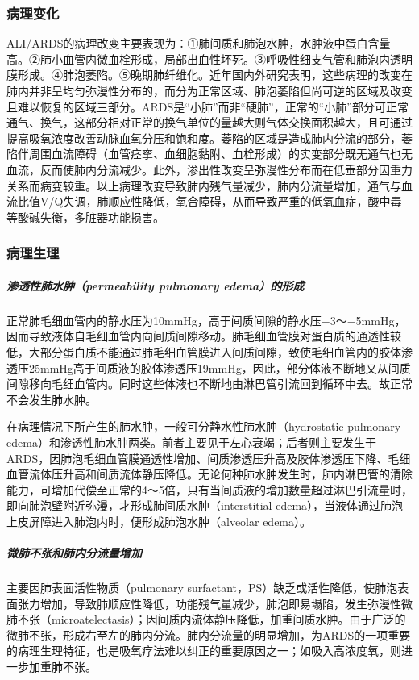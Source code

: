 \subsubsection{病理变化}

ALI/ARDS的病理改变主要表现为：①肺间质和肺泡水肿，水肿液中蛋白含量高。②肺小血管内微血栓形成，局部出血性坏死。③呼吸性细支气管和肺泡内透明膜形成。④肺泡萎陷。⑤晚期肺纤维化。近年国内外研究表明，这些病理的改变在肺内并非呈均匀弥漫性分布的，而分为正常区域、肺泡萎陷但尚可逆的区域及改变且难以恢复的区域三部分。ARDS是“小肺”而非“硬肺”，正常的“小肺”部分可正常通气、换气，这部分相对正常的换气单位的量越大则气体交换面积越大，且可通过提高吸氧浓度改善动脉血氧分压和饱和度。萎陷的区域是造成肺内分流的部分，萎陷伴周围血流障碍（血管痉挛、血细胞黏附、血栓形成）的实变部分既无通气也无血流，反而使肺内分流减少。此外，渗出性改变呈弥漫性分布而在低垂部分因重力关系而病变较重。以上病理改变导致肺内残气量减少，肺内分流量增加，通气与血流比值V/Q失调，肺顺应性降低，氧合障碍，从而导致严重的低氧血症，酸中毒等酸碱失衡，多脏器功能损害。

\subsubsection{病理生理}

\subparagraph{渗透性肺水肿（permeability pulmonary edema）的形成}

正常肺毛细血管内的静水压为10mmHg，高于间质间隙的静水压−3～−5mmHg，因而导致液体自毛细血管内向间质间隙移动。肺毛细血管膜对蛋白质的通透性较低，大部分蛋白质不能通过肺毛细血管膜进入间质间隙，致使毛细血管内的胶体渗透压25mmHg高于间质液的胶体渗透压19mmHg，因此，部分体液不断地又从间质间隙移向毛细血管内。同时这些体液也不断地由淋巴管引流回到循环中去。故正常不会发生肺水肿。

在病理情况下所产生的肺水肿，一般可分静水性肺水肿（hydrostatic pulmonary
edema）和渗透性肺水肿两类。前者主要见于左心衰竭；后者则主要发生于ARDS，因肺泡毛细血管膜通透性增加、间质渗透压升高及胶体渗透压下降、毛细血管流体压升高和间质流体静压降低。无论何种肺水肿发生时，肺内淋巴管的清除能力，可增加代偿至正常的4～5倍，只有当间质液的增加数量超过淋巴引流量时，即向肺泡壁附近弥漫，才形成肺间质水肿（interstitial
edema），当液体通过肺泡上皮屏障进入肺泡内时，便形成肺泡水肿（alveolar
edema）。

\subparagraph{微肺不张和肺内分流量增加}

主要因肺表面活性物质（pulmonary
surfactant，PS）缺乏或活性降低，使肺泡表面张力增加，导致肺顺应性降低，功能残气量减少，肺泡即易塌陷，发生弥漫性微肺不张（microatelectasis）；因间质内流体静压降低，加重间质水肿。由于广泛的微肺不张，形成右至左的肺内分流。肺内分流量的明显增加，为ARDS的一项重要的病理生理特征，也是吸氧疗法难以纠正的重要原因之一；如吸入高浓度氧，则进一步加重肺不张。

